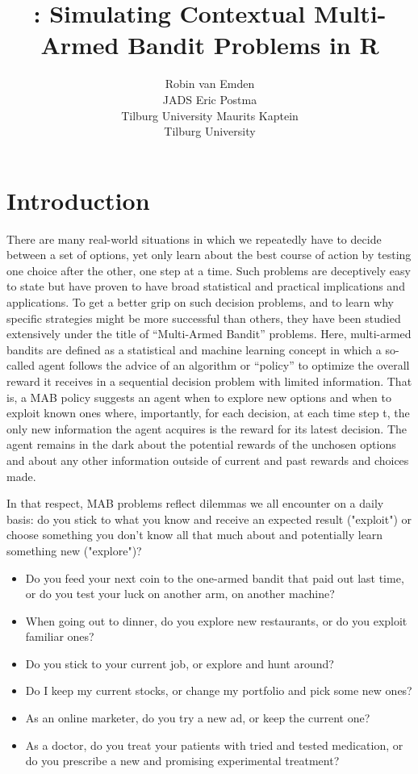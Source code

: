 \documentclass[nojss]{jss}\usepackage[]{graphicx}\usepackage[]{color}
\author{Robin van Emden\\JADS \And
  Eric Postma\\Tilburg University \And
  Maurits Kaptein\\Tilburg University}
\title{\pkg{contextual}: Simulating Contextual Multi-Armed Bandit Problems in R}
\begin{document}





\section{Introduction}

There are many real-world situations in which we repeatedly have to decide between a set of options, yet only learn about the best course of action by testing one choice after the other, one step at a time. Such problems are deceptively easy to state but have proven to have broad statistical and practical implications and applications. To get a better grip on such decision problems, and to learn why specific strategies might be more successful than others, they have been studied extensively under the title of \textquotedblleft{}Multi-Armed Bandit\textquotedblright{} problems. Here,  multi-armed bandits are defined as a statistical and machine learning concept in which a so-called agent follows the advice of an algorithm or \textquotedblleft{}policy\textquotedblright{} to optimize the overall reward it receives in a sequential decision problem with limited information. That is, a MAB policy suggests an agent when to explore new options and when to exploit known ones \textendash{} where, importantly, for each decision, at each time step t, the only new information the agent acquires is the reward for its latest decision. The agent remains in the dark about the potential rewards of the unchosen options and about any other information outside of current and past rewards and choices made.


In that respect, MAB problems reflect dilemmas we all encounter on a daily basis: do you stick to what you know and receive an expected result ("exploit") or choose something you don't know all that much about and potentially learn something new ("explore")?

\begin{itemize}
\item Do you feed your next coin to the one-armed bandit that paid out last time, or do you test your luck on another arm, on another machine?
\item When going out to dinner, do you explore new restaurants, or do you exploit familiar ones?
\item Do you stick to your current job, or explore and hunt around?
\item Do I keep my current stocks, or change my portfolio and pick some new ones?
\item As an online marketer, do you try a new ad, or keep the current one?
\item As a doctor, do you treat your patients with tried and tested medication, or do you prescribe a new and promising experimental treatment?
\end{itemize}
\end{document}
